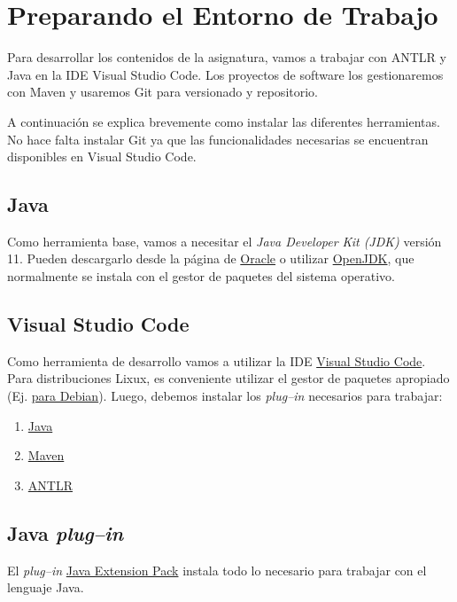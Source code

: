 \section{Preparando el Entorno de Trabajo}
\label{intro}

Para desarrollar los contenidos de la asignatura, vamos a trabajar con ANTLR y Java en la IDE Visual Studio Code.  Los proyectos de software los gestionaremos con Maven y usaremos Git para versionado y repositorio.

A continuación se explica brevemente como instalar las diferentes herramientas.  No hace falta instalar Git ya que las funcionalidades necesarias se encuentran disponibles en Visual Studio Code.

\subsection{Java}
\label{Java}

Como herramienta base, vamos a necesitar el \emph{Java Developer Kit (JDK)} versión 11. Pueden descargarlo desde la página de \href{https://www.oracle.com/java/technologies/javase-downloads.html}{Oracle} o utilizar \href{https://openjdk.java.net/}{OpenJDK}, que normalmente se instala con el gestor de paquetes del sistema operativo.


\subsection{Visual Studio Code}
\label{vscode}

Como herramienta de desarrollo vamos a utilizar la IDE \href{https://code.visualstudio.com/}{Visual Studio Code}.  Para distribuciones Lixux, es conveniente utilizar el gestor de paquetes apropiado (Ej. \href{https://wiki.debian.org/VisualStudioCode}{para Debian}).  Luego, debemos instalar los \emph{plug--in} necesarios para trabajar:
\begin{enumerate}
	\item \hyperref[pluginJava]{Java}
	\item \hyperref[pluginMaven]{Maven}
	\item \hyperref[pluginANTLR]{ANTLR}
\end{enumerate}

\subsection{Java \emph{plug--in}}
\label{pluginJava}

El \emph{plug--in} \href{https://marketplace.visualstudio.com/items?itemName=vscjava.vscode-java-pack}{Java Extension Pack} instala todo lo necesario para trabajar con el lenguaje Java.

